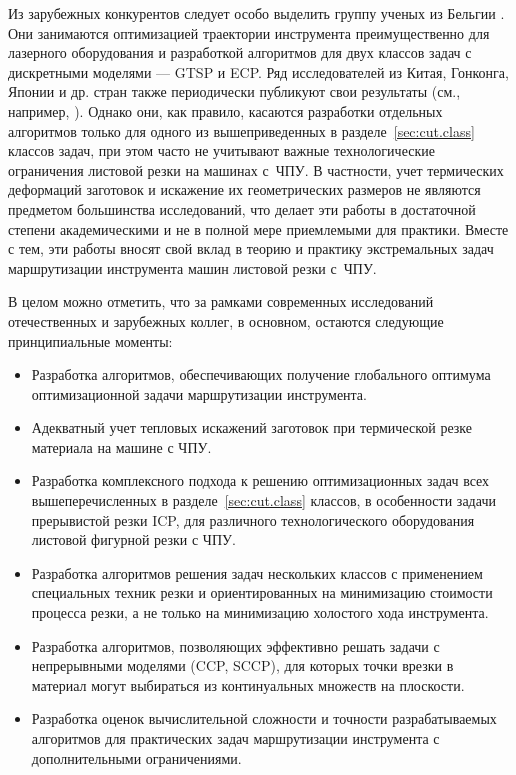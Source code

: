 Из зарубежных конкурентов следует особо выделить группу ученых из Бельгии
\cite{bi:Dewil2014,bi:dewil-review,bi:Dewil2015Mar,bi:Dewil2015}.
Они занимаются
оптимизацией траектории инструмента преимущественно для лазерного оборудования и разработкой
алгоритмов для двух классов задач с дискретными моделями ---
GTSP и ECP.
Ряд исследователей из Китая, Гонконга,
Японии и др. стран также периодически публикуют свои результаты
(см., например,
\cite{bi:Kandasamy2020Mar,bi:Li2020Feb,bi:Vicencio,Helsgaun-2015,bi:Ezzat2014Mar,bi:Ye2013,bi:Yun2013May,bi:VijayAnand2015Feb}).
Однако они, как правило,
касаются разработки отдельных алгоритмов только для одного из вышеприведенных в
разделе~\ref{sec:cut.class}
классов задач, при этом часто не учитывают важные технологические
ограничения листовой резки на машинах с~ЧПУ.
В частности, учет термических деформаций заготовок и искажение их
геометрических размеров не являются предметом большинства исследований,
что делает эти работы в достаточной степени академическими
и не в полной мере приемлемыми для практики.
Вместе с тем, эти работы вносят свой вклад в теорию и практику
экстремальных задач маршрутизации инструмента машин листовой резки с~ЧПУ.

В целом  можно отметить,
что за рамками современных исследований отечественных и зарубежных коллег,
в основном, остаются следующие принципиальные моменты:
\begin{itemize}
  \item
  Разработка алгоритмов, обеспечивающих получение глобального оптимума оптимизационной задачи маршрутизации инструмента.
  \item
  Адекватный учет тепловых искажений заготовок при термической резке материала на машине с ЧПУ.
  \item
  Разработка комплексного подхода к решению оптимизационных задач
  всех вышеперечисленных в разделе~\ref{sec:cut.class}
  классов,
  в особенности задачи прерывистой резки ICP,
  для различного технологического оборудования листовой фигурной резки с ЧПУ.
  \item
  Разработка алгоритмов решения задач нескольких классов
  с применением специальных техник резки и ориентированных на минимизацию стоимости процесса резки,
  а не только на минимизацию холостого хода инструмента.
  \item
  Разработка алгоритмов,
  позволяющих эффективно решать задачи с непрерывными моделями
  (CCP, SCCP),
  для которых точки врезки в материал могут выбираться из континуальных множеств на плоскости.
  \item
  Разработка оценок вычислительной сложности и точности
  разрабатываемых алгоритмов для практических задач маршрутизации инструмента
  с дополнительными ограничениями.
\end{itemize}

